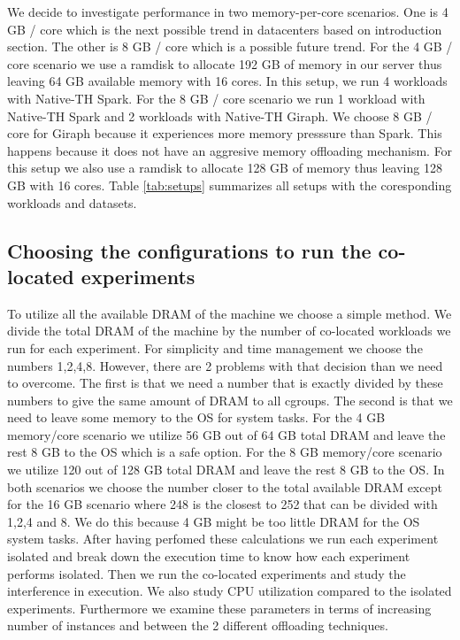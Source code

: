 We decide to investigate performance in two memory-per-core scenarios. One is 4 GB / core 
which is the next possible trend in datacenters based on introduction section. The other
is 8 GB / core which is a possible future trend. For the 4 GB / core scenario we use a ramdisk to 
allocate 192 GB of memory in our server thus leaving 64 GB available memory with 16 cores. In this setup, we run 4
workloads with Native-TH Spark. For the 8 GB / core scenario we run 1 workload with Native-TH Spark and 2 workloads with Native-TH Giraph. We choose 8 GB / core for Giraph because it experiences more memory presssure than Spark. This happens because it does not have
an aggresive memory offloading mechanism. For this setup we also use a ramdisk to allocate 128 GB of memory thus leaving 
128 GB with 16 cores. 
Table \ref{tab:setups} summarizes all setups with the coresponding workloads and datasets.

\subsection{Choosing the configurations to run the co-located experiments}
To utilize all the available DRAM of the machine we choose a simple method. 
We divide the total DRAM of the machine by the number of co-located workloads we run for each experiment.
For simplicity and time management we choose the numbers 1,2,4,8. However, there are 2 problems with that decision
than we need to overcome. The first is that we need a number that is exactly divided by these numbers to give the same amount of DRAM to
all cgroups. The second is that we need to leave some memory to the OS for system tasks. For the 4 GB memory/core scenario we utilize
56 GB out of 64 GB total DRAM and leave the rest 8 GB to the OS which is a safe option. For the 8 GB memory/core scenario we utilize
120 out of 128 GB total DRAM and leave the rest 8 GB to the OS. 
In both scenarios we choose the number closer to
the total available DRAM except for the 16 GB scenario where 248 is the closest to 252 that can be divided with 1,2,4 and 8. We do this because 4 GB might be too little DRAM for the OS system tasks. After having perfomed these calculations we run each experiment isolated and break down the execution time to know how each experiment performs isolated. Then we run the co-located experiments and study the interference in execution. We also study CPU utilization compared to the isolated experiments. Furthermore we examine these parameters in terms of increasing number of instances and between the 2 different offloading techniques. 

